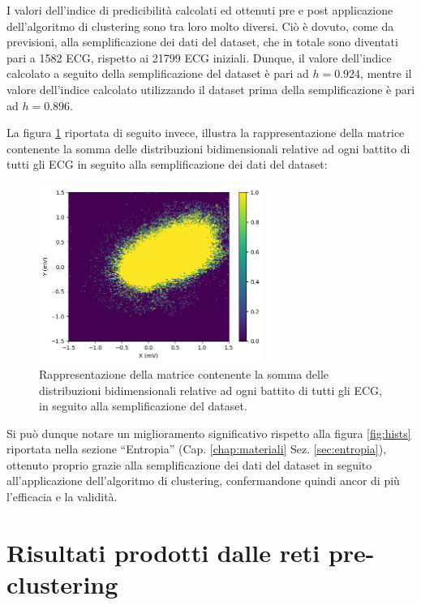 \documentclass[12pt,italian]{report}
\begin{document}
I valori dell'indice di predicibilità calcolati ed ottenuti pre e post applicazione dell'algoritmo di clustering sono tra loro molto diversi. Ciò è dovuto, come da previsioni, alla semplificazione dei dati del dataset, che in totale sono diventati pari a 1582 ECG, rispetto ai 21799 ECG iniziali. Dunque, il valore dell'indice calcolato a seguito della semplificazione del dataset è pari ad $ h = 0.924 $, mentre il valore dell'indice calcolato utilizzando il dataset prima della semplificazione è pari ad $ h = 0.896 $.

La figura \ref{fig:hists2} riportata di seguito invece, illustra la rappresentazione della matrice contenente la somma delle distribuzioni bidimensionali relative ad ogni battito di tutti gli ECG in seguito alla semplificazione dei dati del dataset:

\begin{figure}[H]
    \centering
    \includegraphics[width=0.65\textwidth]{immagini/hists2.png}
    \captionsetup{justification=centering}
    \caption{Rappresentazione della matrice contenente la somma delle distribuzioni bidimensionali relative ad ogni battito di tutti gli ECG, in seguito alla semplificazione del dataset.}
    \label{fig:hists2}
\end{figure}

Si può dunque notare un miglioramento significativo rispetto alla figura \ref{fig:hists} riportata nella sezione ``Entropia'' (Cap. \ref{chap:materiali} Sez. \ref{sec:entropia}), ottenuto proprio grazie alla semplificazione dei dati del dataset in seguito all'applicazione dell'algoritmo di clustering, confermandone quindi ancor di più l'efficacia e la validità.

\section{Risultati prodotti dalle reti pre-clustering}
\label{sec:network_risultati}
\end{document}
